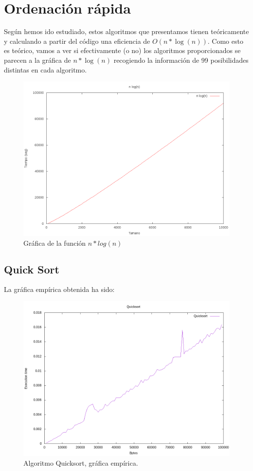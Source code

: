 \section{Ordenación rápida} %
Según hemos ido estudiado, estos algoritmos que presentamos tienen teóricamente y calculando a partir del código una eficiencia de $O(n*\log(n) )$. Como esto es teórico, vamos a ver si efectivamente (o no) los algoritmos proporcionados se parecen a la gráfica de $n*\log(n)$ recogiendo la información de 99 posibilidades distintas en cada algoritmo.
\begin{figure}[H]
	\centering
	\includegraphics[scale=0.5]{imagenes/nlog(n)3.png}
	\caption{Gráfica de la función $n*log(n)$}
	\label{fig:E8}
\end{figure}
\subsection{Quick Sort}
La gráfica empírica obtenida ha sido:
\begin{figure}[H]
	\centering
	\includegraphics[scale=0.5]{imagenes/quicksort.png}
	\caption{Algoritmo Quicksort, gráfica empírica. }
	\label{fig:E9}
\end{figure}

